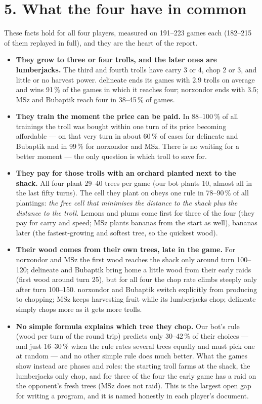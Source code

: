 \documentclass[10pt,a4paper]{article}
\begin{document}
\section*{5. What the four have in common}

These facts hold for all four players, measured on 191--223 games each (182--215 of them replayed in full), and they are the heart of the report.

\begin{itemize}
\item \textbf{They grow to three or four trolls, and the later ones are lumberjacks.} The third and fourth trolls have carry 3 or 4, chop 2 or 3, and little or no harvest power. delineate ends its games with 2.9 trolls on average and wins 91\,\% of the games in which it reaches four; norxondor ends with 3.5; MSz and Bubaptik reach four in 38--45\,\% of games.
\item \textbf{They train the moment the price can be paid.} In 88--100\,\% of all trainings the troll was bought within one turn of its price becoming affordable --- on that very turn in about 60\,\% of cases for delineate and Bubaptik and in 99\,\% for norxondor and MSz. There is no waiting for a better moment --- the only question is which troll to save for.
\item \textbf{They pay for those trolls with an orchard planted next to the shack.} All four plant 29--40 trees per game (our bot plants 10, almost all in the last fifty turns). The cell they plant on obeys one rule in 78--90\,\% of all plantings: \emph{the free cell that minimises the distance to the shack plus the distance to the troll}. Lemons and plums come first for three of the four (they pay for carry and speed; MSz plants bananas from the start as well), bananas later (the fastest-growing and softest tree, so the quickest wood).
\item \textbf{Their wood comes from their own trees, late in the game.} For norxondor and MSz the first wood reaches the shack only around turn 100--120; delineate and Bubaptik bring home a little wood from their early raids (first wood around turn 25), but for all four the chop rate climbs steeply only after turn 100--150. norxondor and Bubaptik switch explicitly from producing to chopping; MSz keeps harvesting fruit while its lumberjacks chop; delineate simply chops more as it gets more trolls.
\item \textbf{No simple formula explains which tree they chop.} Our bot's rule (wood per turn of the round trip) predicts only 30--42\,\% of their choices --- and just 16--30\,\% when the rule rates several trees equally and must pick one at random --- and no other simple rule does much better. What the games show instead are phases and roles: the starting troll farms at the shack, the lumberjacks only chop, and for three of the four the early game has a raid on the opponent's fresh trees (MSz does not raid). This is the largest open gap for writing a program, and it is named honestly in each player's document.
\end{itemize}
\end{document}
